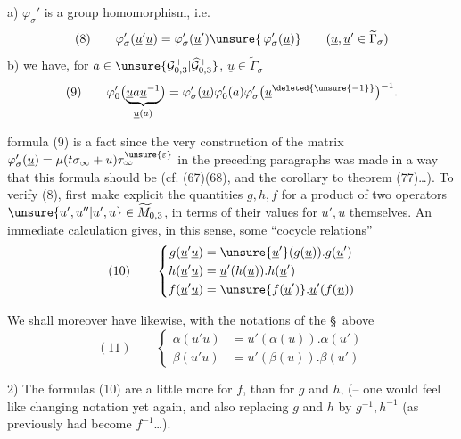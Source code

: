a) $\varphi_\sigma'$ is a group homomorphism, i.e.
\[
(8)\qquad\varphi_\sigma'(\underline u'\underline u)=\varphi_\sigma'(\underline u')\unsure{\,\varphi_\sigma'(\underline u)}\qquad(\underline u,\underline u'\in\widetilde\Gamma_\sigma)
\]
b) we have, for $a\in\unsure{\mathcal G_{0,3}^{+}|\widehat{\mathcal G}_{0,3}^{+}}$, $\underline u\in\widetilde\Gamma_\sigma$
\[
(9)\qquad\varphi_0'\bigl(\underbrace{\underline u a\underline u^{-1}}_{\underline u(a)}\bigr)=\varphi_\sigma'(\underline u)\varphi_0'(a)\varphi_\sigma'\bigl(\underline u^{\deleted{\unsure{-1}}}\bigr)^{-1}.
\]

 formula (9) is a fact   since the  very construction of the matrix $\varphi_\sigma'(\underline u)=\mu(t\sigma_\infty+u)\tau_\infty^{\unsure{\varepsilon}}$ in the preceding paragraphs was made in a way   that this formula should be  (cf. (67)(68), and the corollary to theorem (77)\ldots). To verify (8),   first make explicit the quantities $g,h,f$ for a product of two operators $\unsure{u',u''|u',u}\in\widetilde M_{0,3}$, in terms of their values for $u',u$ themselves. An immediate calculation gives, in this sense, some ``cocycle relations''
\[
(10)\qquad\left\{\begin{aligned}
g(\underline u'\underline u)&=\unsure{\underline u'}(g(\underline u)).g(\underline u')\\
h(\underline u'\underline u)&=\underline u'(h(\underline u)).h(\underline u')\\
f(\underline u'\underline u)&=\unsure{f(\underline u')}.\underline u'(f(\underline u))
\end{aligned}\right.
\]


 We shall moreover have likewise, with the notations of the \S\ above
\[
(11)\qquad\left\{\begin{aligned}
\alpha(u'u)&=u'(\alpha(u)).\alpha(u')\\
\beta(u'u)&=u'(\beta(u)).\beta(u')
\end{aligned}\right.
\]

 2) The formulas (10) are a little more  for $f$, than for $g$ and $h$,  (-- one would feel like changing notation yet again, and also replacing $g$ and $h$ by $g^{-1},h^{-1}$ (as previously  had become $f^{-1}$\ldots).

